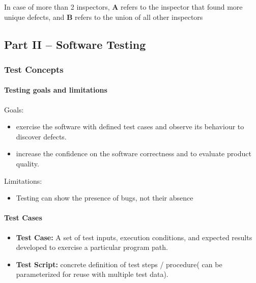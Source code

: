 \documentclass[../ESOF_notes.tex]{subfiles}
\begin{document}
In case of more than 2 inspectors, \textbf{A} refers to the inspector that found
more unique defects, and \textbf{B} refers to the union of all other inspectors


\subsection{Part II – Software Testing}
\subsubsection{Test Concepts}
\paragraph{Testing goals and limitations}

Goals:
\begin{itemize}
    \item exercise the software with defined test cases
          and observe its behaviour to discover defects.
    \item  increase the confidence on the software
          correctness and to evaluate product quality.
\end{itemize}

Limitations:
\begin{itemize}
    \item Testing can show the presence of bugs, not their absence
\end{itemize}
\paragraph{Test Cases}
\begin{itemize}
    \item \textbf{Test Case:} A set of test inputs,
          execution conditions, and expected results developed
          to exercise a particular program path.
    \item \textbf{Test Script:} concrete definition of test
          steps / procedure( can be parameterized for reuse with 
          multiple test data).
\end{itemize}
\end{document}
